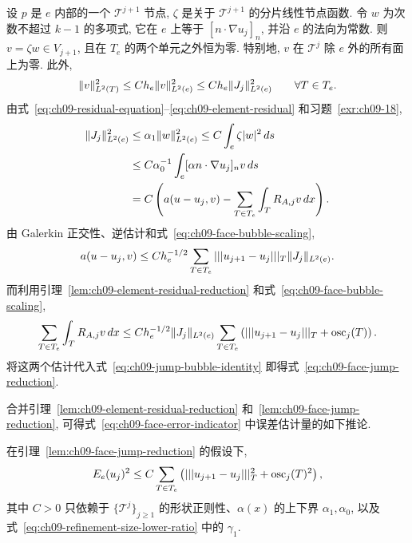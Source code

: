 \begin{Proof}
设 $p$ 是 $e$ 内部的一个 $\mathcal T^{j+1}$ 节点, $\zeta$ 是关于 $\mathcal T^{j+1}$ 的分片线性节点函数. 令 $w$ 为次数不超过 $k-1$ 的多项式, 它在 $e$ 上等于 $[n\cdot\nabla u_j]_n$, 并沿 $e$ 的法向为常数. 则 $v=\zeta w\in V_{j+1}$, 且在 $T_e$ 的两个单元之外恒为零. 特别地, $v$ 在 $\mathcal T^j$ 除 $e$ 外的所有面上为零. 此外,
\begin{equation}
\MathBookFormulaID{formula-ch09-face-bubble-scaling}
\label{eq:ch09-face-bubble-scaling}
\|v\|_{L^2(T)}^2
\leq Ch_e\|v\|_{L^2(e)}^2
\leq Ch_e\|J_j\|_{L^2(e)}^2
\qquad\forall T\in T_e.
\end{equation}
由式~\eqref{eq:ch09-residual-equation}--\eqref{eq:ch09-element-residual} 和习题~\ref{exr:ch09-18},
\begin{align}
\MathBookFormulaID{formula-ch09-jump-bubble-identity}
\label{eq:ch09-jump-bubble-identity}
\|J_j\|_{L^2(e)}^2
&\leq\alpha_1\|w\|_{L^2(e)}^2
\leq C\int_e\zeta|w|^2\,ds\notag\\
&\leq C\alpha_0^{-1}\int_e[\alpha n\cdot\nabla u_j]_nv\,ds\notag\\
&=C\left(a(u-u_j,v)-\sum_{T\in T_e}\int_TR_{A,j}v\,dx\right).
\end{align}
由 Galerkin 正交性、逆估计和式~\eqref{eq:ch09-face-bubble-scaling},
\[
\MathBookFormulaID{formula-ch09-jump-energy-term-bound}
a(u-u_j,v)
\leq Ch_e^{-1/2}\sum_{T\in T_e}|||u_{j+1}-u_j|||_T\|J_j\|_{L^2(e)}.
\]
而利用引理~\ref{lem:ch09-element-residual-reduction} 和式~\eqref{eq:ch09-face-bubble-scaling},
\[
\MathBookFormulaID{formula-ch09-jump-volume-term-bound}
\sum_{T\in T_e}\int_TR_{A,j}v\,dx
\leq Ch_e^{-1/2}\|J_j\|_{L^2(e)}
\sum_{T\in T_e}\left(|||u_{j+1}-u_j|||_T+\operatorname{osc}_j(T)\right).
\]
将这两个估计代入式~\eqref{eq:ch09-jump-bubble-identity} 即得式~\eqref{eq:ch09-face-jump-reduction}.
\end{Proof}

合并引理~\ref{lem:ch09-element-residual-reduction} 和~\ref{lem:ch09-face-jump-reduction}, 可得式~\eqref{eq:ch09-face-error-indicator} 中误差估计量的如下推论.

\begin{Corollary}
\label{cor:ch09-estimator-level-reduction}
在引理~\ref{lem:ch09-face-jump-reduction} 的假设下,
\[
\MathBookFormulaID{formula-ch09-estimator-level-reduction}
E_e(u_j)^2
\leq C\sum_{T\in T_e}
\left(|||u_{j+1}-u_j|||_T^2+\operatorname{osc}_j(T)^2\right),
\]
其中 $C>0$ 只依赖于 $\{\mathcal T^j\}_{j\geq1}$ 的形状正则性、$\alpha(x)$ 的上下界 $\alpha_1,\alpha_0$, 以及式~\eqref{eq:ch09-refinement-size-lower-ratio} 中的 $\gamma_1$.
\end{Corollary}

